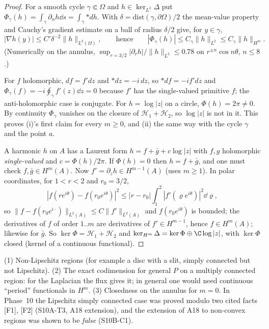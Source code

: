 \begin{proof}
For a smooth cycle $\gamma\Subset\Omega$ and $h\in\ker_{L^2}\Delta$ put $\Phi_\gamma(h)=\int_\gamma\partial_nh\dd s=\int_\gamma{*dh}$. With $\delta=\mathrm{dist}(\gamma,\partial\Omega)/2$ the mean-value property and Cauchy's gradient estimate on a ball of radius $\delta/2$ give, for $y\in\gamma$,
\[
|\nabla h(y)|\le C'\delta^{-2}\|h\|_{L^2(\Omega)},\qquad\text{hence}\qquad |\Phi_\gamma(h)|\le C_\gamma\|h\|_{L^2}\le C_\gamma\|h\|_{H^m}.
\]
(Numerically on the annulus, $\sup_{r=3/2}|\partial_rh|/\|h\|_{L^2}\le0.78$ on $r^{\pm n}\cos n\theta$, $n\le8$.)

For $f$ holomorphic, $df=f'dz$ and ${*dz}=-i\,dz$, so ${*df}=-if'dz$ and $\Phi_\gamma(f)=-i\oint_\gamma f'(z)\dd z=0$ because $f'$ has the single-valued primitive $f$; the anti-holomorphic case is conjugate. For $h=\log|z|$ on a circle, $\Phi(h)=2\pi\ne0$. By continuity $\Phi_\gamma$ vanishes on the closure of $\mathcal H_1+\mathcal H_2$, so $\log|z|$ is not in it. This proves (i)'s first claim for every $m\ge0$, and (ii) the same way with the cycle $\gamma$ and the point $a$.

A harmonic $h$ on $A$ has a Laurent form $h=f+\bar g+c\log|z|$ with $f,g$ holomorphic \emph{single-valued} and $c=\Phi(h)/2\pi$. If $\Phi(h)=0$ then $h=f+\bar g$, and one must check $f,\bar g\in H^m(A)$. Now $f'=\partial_zh\in H^{m-1}(A)$ (uses $m\ge1$). In polar coordinates, for $1<r<2$ and $r_0=3/2$,
\[
|f(re^{i\theta})-f(r_0e^{i\theta})|^2\le|r-r_0|\int_1^2|f'(\varrho e^{i\theta})|^2\dd\varrho ,
\]
so $\|f-f(r_0e^{i\cdot})\|_{L^2(A)}\le C\|f'\|_{L^2(A)}$ and $f(r_0e^{i\theta})$ is bounded; the derivatives of $f$ of order $1..m$ are derivatives of $f'\in H^{m-1}$, hence $f\in H^m(A)$; likewise for $\bar g$. So $\ker\Phi=\mathcal H_1+\mathcal H_2$ and $\ker_{H^m}\Delta=\ker\Phi\oplus\C\log|z|$, with $\ker\Phi$ closed (kernel of a continuous functional).

\end{proof}

\begin{caution}[title=What remains open]
(1) Non-Lipschitz regions (for example a disc with a slit, simply connected but not Lipschitz). (2) The exact codimension for general $P$ on a multiply connected region: for the Laplacian the flux gives it; in general one would need continuous ``period'' functionals in $H^m$. (3) Closedness on the annulus for $m=0$. In Phase~10 the Lipschitz simply connected case was proved modulo two cited facts [F1], [F2] (S10A-T3, A18 extension), and the extension of A18 to non-convex regions was shown to be \emph{false} (S10B-C1).
\end{caution}
